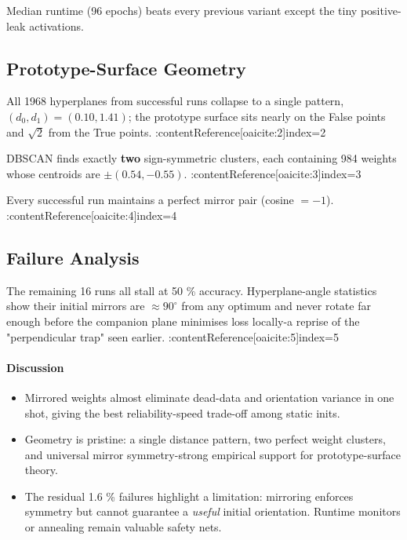 Median runtime (96 epochs) beats every previous variant except the tiny
positive-leak activations.

\subsection*{Prototype-Surface Geometry}

\begin{description}[leftmargin=2em]
  \item[Distance clusters]  
        All 1968 hyperplanes from successful runs collapse to a single
        pattern, \((d_{0},d_{1})=(0.10,1.41)\); the prototype surface
        sits nearly on the False points and \(\sqrt2\) from the True
        points. :contentReference[oaicite:2]{index=2}
  \item[Weight clusters]  
        DBSCAN finds exactly \textbf{two} sign-symmetric clusters, each
        containing 984 weights whose centroids are \(\pm(0.54,-0.55)\). :contentReference[oaicite:3]{index=3}
  \item[Mirror symmetry]  
        Every successful run maintains a perfect mirror pair (cosine
        \(=-1\)). :contentReference[oaicite:4]{index=4}
\end{description}

\subsection*{Failure Analysis}
The remaining 16 runs all stall at 50 \% accuracy.  Hyperplane-angle
statistics show their initial mirrors are
\(\approx\!90^{\circ}\) from any optimum and never rotate far enough
before the companion plane minimises loss locally-a reprise of the
"perpendicular trap" seen earlier. :contentReference[oaicite:5]{index=5}

\paragraph{Discussion}
\begin{itemize}
  \item Mirrored weights almost eliminate dead-data and orientation
        variance in one shot, giving the best reliability-speed trade-off
        among static inits.
  \item Geometry is pristine: a single distance pattern, two perfect
        weight clusters, and universal mirror symmetry-strong empirical
        support for prototype-surface theory.
  \item The residual 1.6 \% failures highlight a limitation: mirroring
        enforces symmetry but cannot guarantee a \emph{useful} initial
        orientation.  Runtime monitors or annealing remain valuable
        safety nets.
\end{itemize}

\hrulefill
